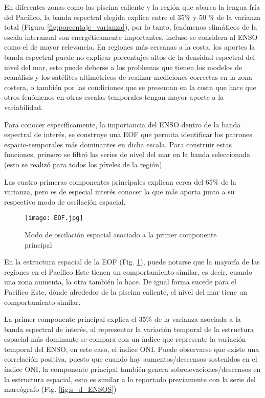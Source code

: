 En diferentes zonas como las piscina caliente y la región que abarca la lengua fría del Pacífico, la banda espectral elegida explica entre el 35\% y 50 \% de la varianza total (Figura \ref{fig:porcentaje_varianza}), por lo tanto, fenómenos climáticos de la escala interanual son energéticamente importantes, incluso se considera al ENSO como el de mayor relevancia. En regiones más cercanas a la costa, los aportes la banda espectral puede no explicar porcentajes altos de la densidad espectral del nivel del mar, esto puede deberse a los problemas que tienen los modelos de reanálisis y los satélites altimétricos de realizar mediciones correctas en la zona costera, o también por las condiciones que se presentan en la costa que hace que otros fenómenos en otras escalas temporales tengan mayor aporte a la variabilidad.

Para conocer específicamente, la importancia del ENSO dentro de la banda espectral de interés, se construye una EOF que permita identificar los patrones espacio-temporales más dominantes en dicha escala. Para construir estas funciones, primero se filtró las series de nivel del mar en la banda seleccionada (esto se realizó para todos los píxeles de la región).

Las cuatro primeras componentes principales explican cerca del 65\% de la varianza, pero es de especial interés conocer la que más aporta junto a su respectivo modo de oscilación espacial.

\begin{figure}[H]
	\centering
	\texttt{[image: EOF.jpg]}
	\caption{Modo de oscilación espacial asociado a la primer componente principal}
	\label{fig:EOF}
\end{figure}

En la estructura espacial de la EOF (Fig. \ref{fig:EOF}), puede notarse que la mayoría de las regiones en el Pacífico Este tienen un comportamiento similar, es decir, cuando una zona aumenta, la otra también lo hace. De igual forma sucede para el Pacífico Este, dónde alrededor de la piscina caliente, el nivel del mar tiene un comportamiento similar. 

La primer componente principal explica el 35\% de la varianza asociada a la banda espectral de interés, al representar la variación temporal de la estructura espacial más dominante se compara con un índice que represente la variación temporal del ENSO, en este caso, el índice ONI. Puede observarse que existe una correlación positiva, puesto que cuando hay aumentos/descensos sostenidos en el índice  ONI, la componente principal también genera sobrelevaciones/descensos en la estructura espacial, esto es similar a lo reportado previamente con la serie del mareógrafo (Fig. \ref{fig:s_d_ENSOS})

